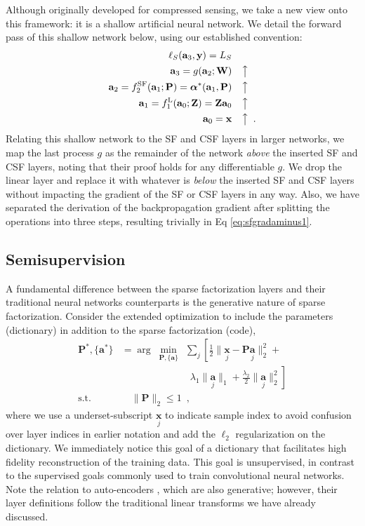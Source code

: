 \documentclass[10pt,twocolumn,letterpaper]{article}
\newcommand{\argmnmz}[1][]{\ensuremath{\arg\;\underset{#1}{\min}\:\:}}
\renewcommand{\vec}{\mathbf}
\newcommand{\loss}{\ensuremath{\ell}}
\newcommand{\x}{\vec{x}}
\newcommand{\y}{\vec{y}}
\newcommand{\Z}{\vec{Z}}
\newcommand{\W}{\vec{W}}
\renewcommand{\P}{\vec{P}}
\renewcommand{\a}{\vec{a}}
\newcommand{\balpha}{\boldsymbol{\alpha}}
\newcommand{\fL}{^{\text{L}}}
\newcommand{\fSF}{^{\text{SF}}}
\begin{document}
Although originally developed for compressed sensing, we take a new view onto this framework: it is a shallow artificial neural network.  We detail the forward pass of this shallow network below, using our established convention: 
%
\begin{align}
\loss_S(\a_3,\y) = L_S & \label{eq:Mairal_model}\\
    \a_3 = g(\a_2;\W) &\quad\big\uparrow \nonumber\\
    \a_2 = f\fSF_2(\a_1;\P) = \balpha^*(\a_1,\P) &\quad\big\uparrow \nonumber\\
%
\a_1 = f\fL_1(\a_0;\Z) = \Z\a_0 &\quad\big\uparrow \nonumber\\
\a_0 = \x &\quad\big\uparrow
\enspace.
    \nonumber 
\end{align}
%
Relating this shallow network to the SF and CSF layers in larger networks, we map the last process $g$ as the remainder of the network \textit{above} the inserted SF and CSF layers, noting that their proof holds for any differentiable $g$.  We drop the linear layer and replace it with whatever is \textit{below} the inserted SF and CSF layers without impacting the gradient of the SF or CSF layers in any way.  Also, we have separated the derivation of the backpropagation gradient after splitting the operations into three steps, resulting trivially in Eq \ref{eq:sfgradaminus1}.



\subsection{Semisupervision}
\label{sec:semisupervision}

A fundamental difference between the sparse factorization layers and their traditional neural networks counterparts is the generative nature of sparse factorization.  Consider the extended optimization to include the parameters (dictionary) in addition to the sparse factorization (code), 
%
\begin{align}
    \P^*,\{\a^*\} &=  \argmnmz[\P,\{\a\}] \sum_j \left[ 
    \frac{1}{2}  \lVert \underset{j}{\x}-\P\underset{j}{\a}\rVert_2^2 +
    \right.
    \label{eq:dictionarylearning}    \\
    &\quad\quad\quad\quad\quad\quad\quad \left.  \lambda_1\lVert\underset{j}{\a}\rVert_1+\frac{\lambda_2}{2}\lVert\underset{j}{\a}\rVert_2^2 \right]
   \nonumber\\
    \text{s.t.} & \quad\lVert \P \rVert_2  \le 1
\enspace, \nonumber
\end{align}
where we use a underset-subscript $\underset{j}{\x}$ to indicate sample index to avoid confusion over layer indices in earlier notation and add the $\ell_2$ regularization on the dictionary.
%
We immediately notice this goal of a dictionary that facilitates high fidelity reconstruction of the training data.  This goal is unsupervised, in contrast to the supervised goals commonly used to train convolutional neural networks.  Note the relation to auto-encoders \cite{HiSaSCIENCE2006}, which are also generative; however, their layer definitions follow the traditional linear transforms we have already discussed.
\end{document}
